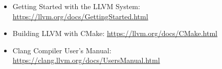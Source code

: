 
\begin{itemize}
\item
Getting Started with the LLVM System: \url{https://llvm.org/docs/GettingStarted.html}

\item
Building LLVM with CMake: \url{https://llvm.org/docs/CMake.html}

\item
Clang Compiler User’s Manual: \url{https://clang.llvm.org/docs/UsersManual.html}
\end{itemize}